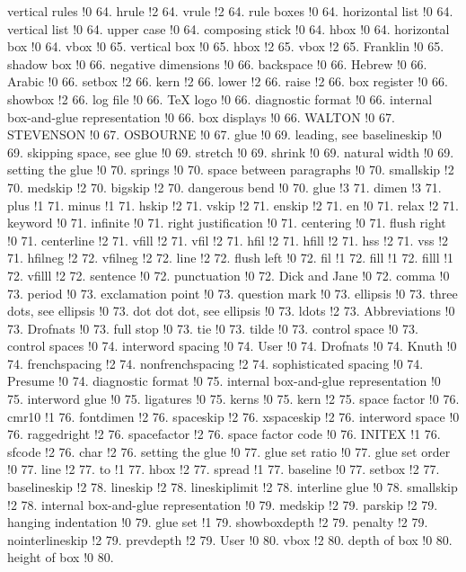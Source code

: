 vertical rules !0 64.
hrule !2 64.
vrule !2 64.
rule boxes !0 64.
horizontal list !0 64.
vertical list !0 64.
upper case !0 64.
composing stick !0 64.
hbox !0 64.
horizontal box !0 64.
vbox !0 65.
vertical box !0 65.
hbox !2 65.
vbox !2 65.
Franklin !0 65.
shadow box !0 66.
negative dimensions !0 66.
backspace !0 66.
Hebrew !0 66.
Arabic !0 66.
setbox !2 66.
kern !2 66.
lower !2 66.
raise !2 66.
box register !0 66.
showbox !2 66.
log file !0 66.
TeX logo !0 66.
diagnostic format !0 66.
internal box-and-glue representation !0 66.
box displays !0 66.
WALTON !0 67.
STEVENSON !0 67.
OSBOURNE !0 67.
glue !0 69.
leading, see baselineskip !0 69.
skipping space, see glue !0 69.
stretch !0 69.
shrink !0 69.
natural width !0 69.
setting the glue !0 70.
springs !0 70.
space between paragraphs !0 70.
smallskip !2 70.
medskip !2 70.
bigskip !2 70.
dangerous bend !0 70.
glue !3 71.
dimen !3 71.
plus !1 71.
minus !1 71.
hskip !2 71.
vskip !2 71.
enskip !2 71.
en !0 71.
relax !2 71.
keyword !0 71.
infinite !0 71.
right justification !0 71.
centering !0 71.
flush right !0 71.
centerline !2 71.
vfill !2 71.
vfil !2 71.
hfil !2 71.
hfill !2 71.
hss !2 71.
vss !2 71.
hfilneg !2 72.
vfilneg !2 72.
line !2 72.
flush left !0 72.
fil !1 72.
fill !1 72.
filll !1 72.
vfilll !2 72.
sentence !0 72.
punctuation !0 72.
Dick and Jane !0 72.
comma !0 73.
period !0 73.
exclamation point !0 73.
question mark !0 73.
ellipsis !0 73.
three dots, see ellipsis !0 73.
dot dot dot, see ellipsis !0 73.
ldots !2 73.
Abbreviations !0 73.
Drofnats !0 73.
full stop !0 73.
tie !0 73.
tilde !0 73.
control space !0 73.
control spaces !0 74.
interword spacing !0 74.
User !0 74.
Drofnats !0 74.
Knuth !0 74.
frenchspacing !2 74.
nonfrenchspacing !2 74.
sophisticated spacing !0 74.
Presume !0 74.
diagnostic format !0 75.
internal box-and-glue representation !0 75.
interword glue !0 75.
ligatures !0 75.
kerns !0 75.
kern !2 75.
space factor !0 76.
cmr10 !1 76.
fontdimen !2 76.
spaceskip !2 76.
xspaceskip !2 76.
interword space !0 76.
raggedright !2 76.
spacefactor !2 76.
space factor code !0 76.
INITEX !1 76.
sfcode !2 76.
char !2 76.
setting the glue !0 77.
glue set ratio !0 77.
glue set order !0 77.
line !2 77.
to !1 77.
hbox !2 77.
spread !1 77.
baseline !0 77.
setbox !2 77.
baselineskip !2 78.
lineskip !2 78.
lineskiplimit !2 78.
interline glue !0 78.
smallskip !2 78.
internal box-and-glue representation !0 79.
medskip !2 79.
parskip !2 79.
hanging indentation !0 79.
glue set !1 79.
showboxdepth !2 79.
penalty !2 79.
nointerlineskip !2 79.
prevdepth !2 79.
User !0 80.
vbox !2 80.
depth of box !0 80.
height of box !0 80.
